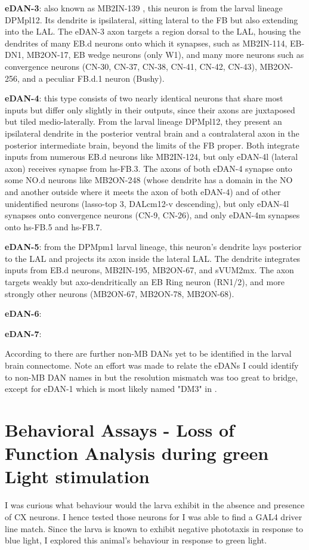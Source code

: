     \textbf{eDAN-3}: also known as MB2IN-139 \citep{eschbach2021circuits}, this neuron is from the larval lineage DPMpl12. Its dendrite is ipsilateral, sitting lateral to the FB but also extending into the LAL. The eDAN-3 axon targets a region dorsal to the LAL, housing the dendrites of  many EB.d neurons onto which it synapses, such as MB2IN-114, EB-DN1, MB2ON-17, EB wedge neurons (only W1), and many more neurons such as convergence neurons (CN-30, CN-37, CN-38, CN-41, CN-42, CN-43), MB2ON-256, and a peculiar FB.d.1 neuron (Bushy).

    \textbf{eDAN-4}: this type consists of two nearly identical neurons that share most inputs but differ only slightly in their outputs, since their axons are juxtaposed but tiled medio-laterally. From the larval lineage DPMpl12, they present an ipsilateral dendrite in the posterior ventral brain and a contralateral axon in the posterior intermediate brain, beyond the limits of the FB proper. Both integrate inputs from numerous EB.d neurons like MB2IN-124, but only eDAN-4l (lateral axon) receives synapse from hs-FB.3. The axons of both eDAN-4 synapse onto some NO.d neurons like MB2ON-248 (whose dendrite has a domain in the NO and another outside where it meets the axon of both eDAN-4) and of other unidentified neurons (lasso-top 3, DALcm12-v descending), but only eDAN-4l synapses onto convergence neurons (CN-9, CN-26), and only eDAN-4m synapses onto hs-FB.5 and hs-FB.7.

    \textbf{eDAN-5}: from the DPMpm1 larval lineage, this neuron's dendrite lays posterior to the LAL and projects its axon inside the lateral LAL. The dendrite integrates inputs from EB.d neurons, MB2IN-195, MB2ON-67, and sVUM2mx. The axon targets weakly but axo-dendritically an EB Ring neuron (RN1/2), and more strongly other neurons (MB2ON-67, MB2ON-78, MB2ON-68).

    \textbf{eDAN-6}: 

    \textbf{eDAN-7}: 

    According to \citep{selcho2009thgal4} there are further non-MB DANs yet to be identified in the larval brain connectome. Note an effort was made to relate the eDANs I could identify to non-MB DAN names in \citep{selcho2009thgal4} but the resolution mismatch was too great to bridge, except for eDAN-1 which is most likely named "DM3" in \citep{selcho2009thgal4}.


\section{Behavioral Assays - Loss of Function Analysis during green Light stimulation}
     I was curious what behaviour would the larva exhibit in the absence and presence of CX neurons. I hence tested those neurons for I was able to find a GAL4 driver line match. Since the larva is known to exhibit negative phototaxis in response to blue light, I explored this animal's behaviour in response to green light.  

